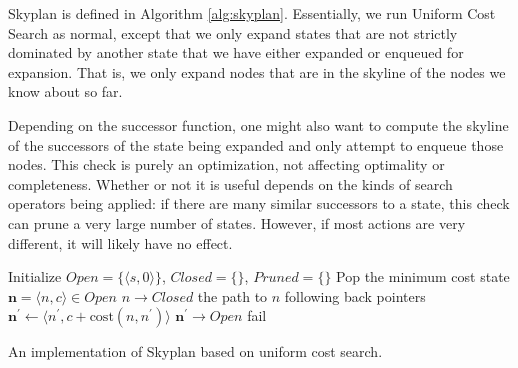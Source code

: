 \documentclass[letterpaper]{article}
\theoremstyle{plain} \newtheorem{theorem}{Theorem} \newtheorem{proposition}{Proposition} \newtheorem{lemma}{Lemma}
\theoremstyle{definition} \newtheorem{definition}{Definition} \newtheorem{conjecture}{Conjecture} \newtheorem*{example}{Example}
\theoremstyle{remark} \newtheorem*{remark}{Remark} \newtheorem*{note}{Note} \newtheorem{case}{Case}
\begin{document}
Skyplan is defined in Algorithm \ref{alg:skyplan}. Essentially, we
run Uniform Cost Search as normal, except that we only expand states
that are not strictly dominated by another state that we have either
expanded or enqueued for expansion. That is, we only expand nodes
that are in the skyline of the nodes we know about so far.

Depending on the successor function, one might also want to compute
the skyline of the successors of the state being expanded and only
attempt to enqueue those nodes.  This check is purely an optimization,
not affecting optimality or completeness. Whether or not it is
useful depends on the kinds of search operators being applied: if
there are many similar successors to a state, this check can prune a very large
number of states. However, if most actions are very different, it will
likely have no effect.

\begin{algorithm}
  \begin{algorithmic}[1]
    \State Initialize $Open=\{\langle s,0\rangle\}$, $Closed=\{\}$, $Pruned=\{\}$
    \State Pop the minimum cost state $\mathbf{n} = \langle n,c\rangle\in Open$
      \State $n\rightarrow Closed$
        \State \Return the path to $n$ following back pointers
      \EndIf
        \State $\mathbf{n^\prime} \gets \langle n^\prime,c+\mathrm{cost}(n,n^\prime)\rangle$
          \State $\mathbf{n^\prime} \rightarrow Open$
        \EndFor
      \EndIf
    \EndWhile
    \State fail
  \EndProcedure
  \end{algorithmic}
\caption{An implementation of Skyplan based on uniform cost search.  }
\label{alg:skyplan}
\end{algorithm}
\end{document}
